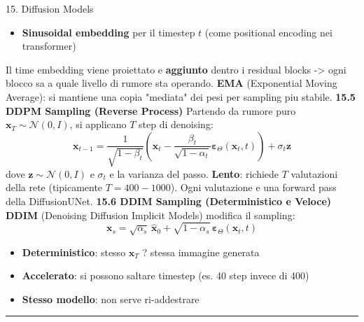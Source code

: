 \documentclass[italian,10pt]{beamer}
\begin{document}
\begin{frame}[allowframebreaks]{15. Diffusion Models}
\begin{itemize}
\item \textbf{Sinusoidal embedding} per il timestep $t$ (come positional encoding nei transformer)
\end{itemize}
Il time embedding viene proiettato e \textbf{aggiunto} dentro i residual blocks -> ogni blocco sa a quale livello di rumore sta operando.
\textbf{EMA} (Exponential Moving Average): si mantiene una copia "mediata" dei pesi per sampling piu stabile.
\textbf{15.5 DDPM Sampling (Reverse Process)}
Partendo da rumore puro $\boldsymbol{x}_T \sim \mathcal{N}(0,I)$, si applicano $T$ step di denoising:
\[ \boldsymbol{x}_{t-1} = \frac{1}{\sqrt{1-\beta_t}}\left(\boldsymbol{x}_t - \frac{\beta_t}{\sqrt{1-\alpha_t}}\boldsymbol{\varepsilon}_\Theta(\boldsymbol{x}_t, t)\right) + \sigma_t \boldsymbol{z} \]
dove $\boldsymbol{z} \sim \mathcal{N}(0,I)$ e $\sigma_t$ e la varianza del passo.
\textbf{Lento}: richiede $T$ valutazioni della rete (tipicamente $T = 400-1000$). Ogni valutazione e una forward pass della DiffusionUNet.
\textbf{15.6 DDIM Sampling (Deterministico e Veloce)}
\textbf{DDIM} (Denoising Diffusion Implicit Models) modifica il sampling:
\[ \boldsymbol{x}_{s} = \sqrt{\alpha_s}\,\hat{\boldsymbol{x}}_0 + \sqrt{1-\alpha_s}\,\boldsymbol{\varepsilon}_\Theta(\boldsymbol{x}_t, t) \]
\begin{itemize}
\item \textbf{Deterministico}: stesso $\boldsymbol{x}_T$ ? stessa immagine generata
\item \textbf{Accelerato}: si possono saltare timestep (es. 40 step invece di 400)
\item \textbf{Stesso modello}: non serve ri-addestrare
\end{itemize}
\medskip\noindent\rule{\textwidth}{0.4pt}\medskip
\end{frame}
\end{document}

